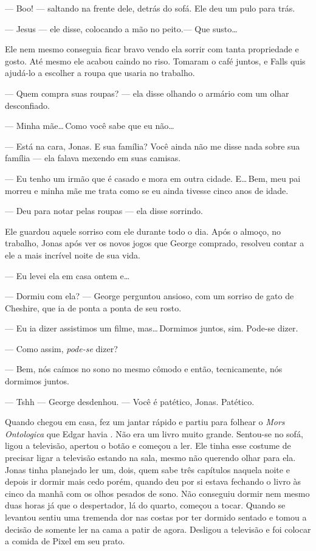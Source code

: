 --- Boo! ---  saltando na frente dele, detrás do sofá. Ele deu um pulo para trás.

--- Jesus --- ele disse, colocando a mão no peito.--- Que susto\ldots

Ele nem mesmo conseguia ficar bravo vendo ela sorrir com tanta propriedade e gosto. Até mesmo ele acabou caindo no riso. Tomaram o café juntos, e Falls quis ajudá-lo a escolher a roupa que usaria no trabalho.

--- Quem compra suas roupas? --- ela disse\mudanca{,} olhando o armário com um olhar desconfiado.

--- Minha mãe\ldots\,Como você sabe que eu não\ldots

--- Está na cara, Jonas. E sua família? Você ainda não me disse nada sobre sua família --- ela falava\mudanca{,} mexendo em suas camisas.

--- Eu tenho um irmão que é casado e mora em outra cidade. E\ldots\,Bem, meu pai morreu e minha mãe me trata como se eu ainda tivesse cinco anos de idade.

--- Deu para notar pelas roupas --- ela disse\mudanca{,} sorrindo.

Ele guardou aquele sorriso com ele durante todo o dia. Após o almoço, no trabalho, Jonas\mudanca{,} após ver os novos jogos que George  comprado, resolveu contar a ele a mais incrível noite de sua vida.

--- Eu levei ela em casa ontem e\ldots

--- Dormiu com ela? --- George perguntou ansioso, com um sorriso de gato de Cheshire, que ia de ponta a ponta de seu rosto.

--- Eu ia dizer assistimos um filme, mas\ldots\,Dormimos juntos, sim. Pode-se dizer.

--- Como assim, \emph{pode-se} dizer?

--- Bem, nós caímos no sono no mesmo cômodo e então, tecnicamente, nós dormimos juntos.

--- Tshh --- George desdenhou. --- Você é patético, Jonas. Patético.

Quando chegou em casa, fez um jantar rápido e partiu para folhear o \emph{Mors Ontologica} que Edgar havia . Não era um livro muito grande. Sentou-se no sofá, ligou a televisão, apertou o botão  e começou a ler. Ele tinha esse costume de precisar ligar a televisão estando na sala, mesmo não querendo olhar para ela. Jonas tinha planejado ler um, dois, quem sabe três capítulos naquela noite e depois ir dormir mais cedo\mudanca{,} porém, quando deu por si\mudanca{,} estava fechando o livro às cinco da manhã\mudanca{,} com os olhos pesados de sono. Não conseguiu dormir nem mesmo duas horas já que o despertador, lá do quarto, começou a tocar. Quando se levantou sentiu uma tremenda dor nas costas por ter dormido sentado\mudanca{,} e tomou a decisão de somente ler na cama a patir de agora. Desligou a televisão e foi colocar a comida de Pixel em seu prato.

